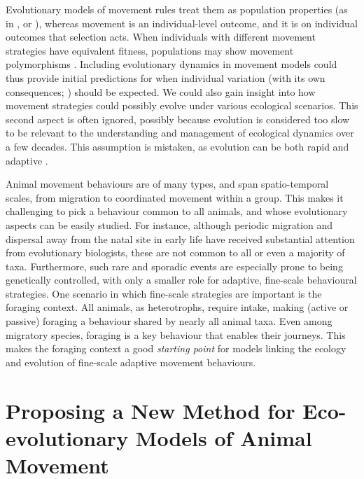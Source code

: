 Evolutionary models of movement rules treat them as population properties (as in \cite[]{dejager2011,dejager2020}, or \cite[]{morris2011}), whereas movement is an individual-level outcome, and it is on individual outcomes that selection acts.
When individuals with different movement strategies have equivalent fitness, populations may show movement polymorphisms \citep{wolf2012,shaw2020,getz2015}.
Including evolutionary dynamics in movement models could thus provide initial predictions for when individual variation (with its own consequences; \cite{spiegel2017}) should be expected.
We could also gain insight into how movement strategies could possibly evolve under various ecological scenarios.
This second aspect is often ignored, possibly because evolution is considered too slow to be relevant to the understanding and management of ecological dynamics over a few decades.
This assumption is mistaken, as evolution can be both rapid and adaptive \citep[][]{bonnet2022}.

Animal movement behaviours are of many types, and span spatio-temporal scales, from migration to coordinated movement within a group.
This makes it challenging to pick a behaviour common to all animals, and whose evolutionary aspects can be easily studied.
For instance, although periodic migration \parencite[e.g.][]{guttal2010} and dispersal \parencite[e.g.][]{hillaert2018b} away from the natal site in early life have received substantial attention from evolutionary biologists, these are not common to all or even a majority of taxa.
Furthermore, such rare and sporadic events are especially prone to being genetically controlled, with only a smaller role for adaptive, fine-scale behavioural strategies.
One scenario in which fine-scale strategies are important is the foraging context.
All animals, as heterotrophs, require intake, making (active or passive) foraging a behaviour shared by nearly all animal taxa.
Even among migratory species, foraging is a key behaviour that enables their journeys.
This makes the foraging context a good \textit{starting point} for models linking the ecology and evolution of fine-scale adaptive movement behaviours.

\section*{Proposing a New Method for Eco-evolutionary Models of Animal Movement}


